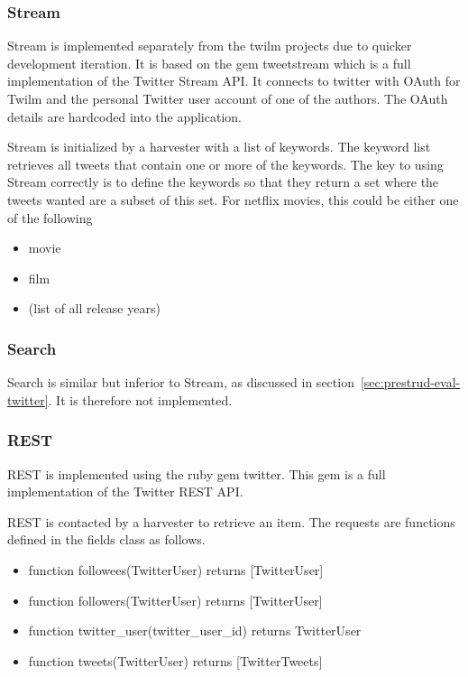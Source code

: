 \subsubsection{Stream}
Stream is implemented separately from the twilm projects due to quicker development iteration. It is based on the gem tweetstream which is a full implementation of the Twitter Stream API. It connects to twitter with OAuth for Twilm and the personal Twitter user account of one of the authors. The OAuth details are hardcoded into the application.

Stream is initialized by a harvester with a list of keywords. The keyword list retrieves all tweets that contain one or more of the keywords. The key to using Stream correctly is to define the keywords so that they return a set where the tweets wanted are a subset of this set. For netflix movies, this could be either one of the following

	\begin{itemize}
	\item movie
	\item film
	\item (list of all release years)
	\end{itemize}

\subsubsection{Search}
Search is similar but inferior to Stream, as discussed in section~\ref{sec:prestrud-eval-twitter}. It is therefore not implemented.

\subsubsection{REST}
REST is implemented using the ruby gem twitter. This gem is a full implementation of the Twitter REST API.

REST is contacted by a harvester to retrieve an item. The requests are functions defined in the fields class as follows.

	\begin{itemize}
	\item function followees(TwitterUser) returns [TwitterUser]
	\item function followers(TwitterUser) returns [TwitterUser]
	\item function twitter\_user(twitter\_user\_id) returns TwitterUser
	\item function tweets(TwitterUser) returns [TwitterTweets]
	\end{itemize}

